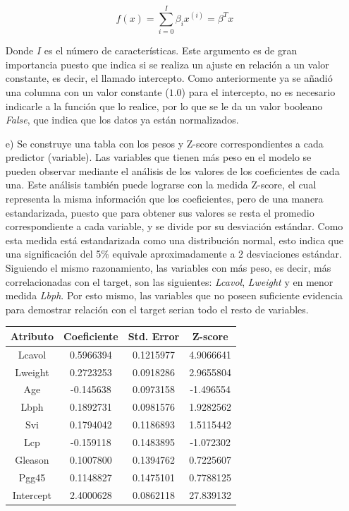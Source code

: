 \documentclass[10pt]{article}
\begin{document}
\begin{itemize}
\begin{equation}
f(x) = \sum_{i=0}^{I} \beta_i x^{(i)} = \beta^T x
\end{equation}

Donde $I$ es el número de características. Este argumento es de gran importancia puesto que indica si se realiza un ajuste en relación a un valor constante, es decir, el llamado intercepto. Como anteriormente ya se añadió una columna con un valor constante ($1.0$) para el intercepto, no es necesario indicarle a la función que lo realice, por lo que se le da un valor booleano \textit{False}, que indica que los datos ya están normalizados.

\item[e)]Se construye una tabla con los pesos y Z-score correspondientes a cada predictor (variable). Las variables que tienen más peso en el modelo se pueden observar mediante el análisis de los valores de los coeficientes de cada una. Este análisis también puede lograrse con la medida Z-score, el cual representa la misma información que los coeficientes, pero de una manera estandarizada, puesto que para obtener sus valores se resta el promedio correspondiente a cada variable, y se divide por su desviación estándar. Como esta medida está estandarizada como una distribución normal, esto indica que una significación del 5\% equivale aproximadamente a 2 desviaciones estándar. Siguiendo el mismo razonamiento, las variables con más peso, es decir, más correlacionadas con el target, son las siguientes: \textit{Lcavol}, \textit{Lweight} y en menor medida \textit{Lbph}. Por esto mismo, las variables que no poseen suficiente evidencia para demostrar relación con el target serian todo el resto de variables.

\begin{table}[!htb]
 \begin{center}
   \begin{tabular}{|c|c|c|c|} \hline
   Atributo & Coeficiente & Std. Error & Z-score \\ \hline
   Lcavol &0.5966394 &0.1215977 &4.9066641 \\
	Lweight & 0.2723253 &0.0918286& 2.9655804 \\
	Age & -0.145638 &0.0973158 &-1.496554 \\
	Lbph & 0.1892731 & 0.0981576& 1.9282562 \\
	Svi & 0.1794042 & 0.1186893 &1.5115442 \\
	Lcp & -0.159118 & 0.1483895 &-1.072302 \\
	Gleason & 0.1007800 &0.1394762& 0.7225607 \\
	Pgg45 & 0.1148827& 0.1475101 &0.7788125 \\
	Intercept & 2.4000628& 0.0862118& 27.839132 \\ \hline
   \end{tabular}
 \end{center}
\end{table}



\end{itemize}
\end{document}
